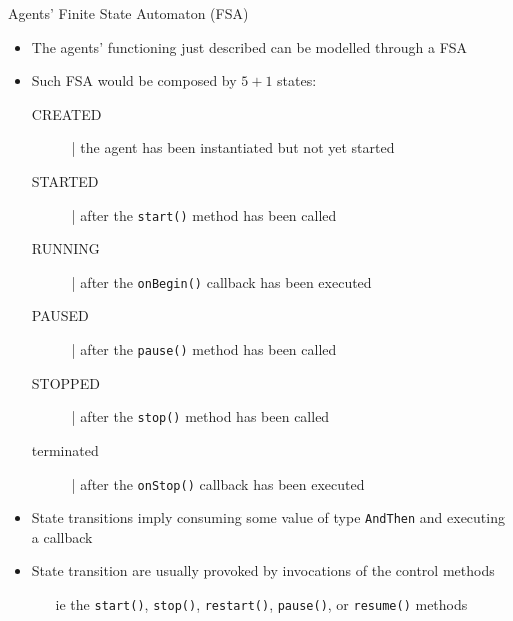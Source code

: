 \documentclass[presentation]{beamer}\mode<presentation>{\usetheme{AMSCesenaPurpleAndGold}}
\begin{document}
\begin{frame}[allowframebreaks]{Agents' Finite State Automaton (FSA)}

    \begin{itemize}
        \item The agents' functioning just described can be modelled through a FSA
        
        \vspace{0.3cm}
        
        \item Such FSA would be composed by $5+1$ states:
        \begin{description}
            \item[CREATED] | the agent has been instantiated but not yet started
            
            \item[STARTED] | after the \texttt{start()} method has been called
            
            \item[RUNNING] | after the \texttt{onBegin()} callback has been executed
            
            \item[PAUSED] | after the \texttt{pause()} method has been called
            
            \item[STOPPED] | after the \texttt{stop()} method has been called
            
            \item[terminated] | after the \texttt{onStop()} callback has been executed
        \end{description}
        
        \framebreak
        
        \item State transitions imply consuming some value of type \texttt{\alert{AndThen}} and executing a callback
        
        \vspace{.3cm}
        
        \item State transition are usually provoked by invocations of the \alert{control methods}
        \begin{itemize}
            \item[ie] the \texttt{start()}, \texttt{stop()}, \texttt{restart()}, \texttt{pause()}, or \texttt{resume()} methods
        \end{itemize}
        

\end{itemize}
\end{frame}
\end{document}
